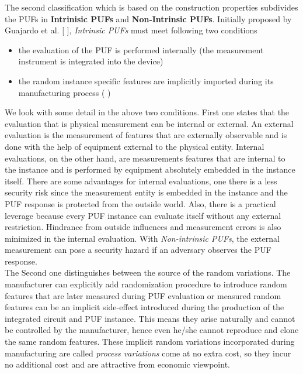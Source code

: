 The second classification which is based on the construction properties subdivides the PUFs in \textbf{Intrinisic PUFs} and \textbf{Non-Intrinsic PUFs}. Initially proposed by Guajardo et al. [ ], \emph{Intrinsic PUFs} must meet following two conditions
\begin{itemize}
	\item the evaluation of the PUF is performed internally (the measurement instrument is integrated into the device)
	\item the random instance specific features are implicitly imported during its manufacturing process ( )
\end{itemize}

We look with some detail in the above two conditions. First one states that the evaluation that is physical measurement can be internal or external. An external evaluation is the measurement of features that are externally observable and is done with the help of equipment external to the physical entity. Internal evaluations, on the other hand, are measurements features that are internal to the instance and is performed by equipment absolutely embedded in the instance itself. There are some
advantages for internal evaluations, one there is a less security risk since the measurement entity is embedded in the instance and the PUF response is protected from the outside world. Also, there is a practical leverage because every PUF instance can evaluate itself without any external restriction. Hindrance from outside influences and measurement errors is also minimized in the internal evaluation. With \emph{Non-intrinsic PUFs}, the external measurement can pose a security
hazard if an adversary observes the PUF response.\\

The Second one distinguishes between the source of the random variations. The manufacturer can explicitly add randomization procedure to introduce random features that are later measured during PUF evaluation or measured random features can be an implicit side-effect introduced during the production of the integrated circuit and PUF instance. This means they arise naturally and cannot be controlled by the manufacturer, hence even he/she cannot reproduce and clone the same random features. These
implicit random variations incorporated during manufacturing are called \emph{process variations} come at no extra cost, so they incur no additional cost and are attractive from economic viewpoint.\\

